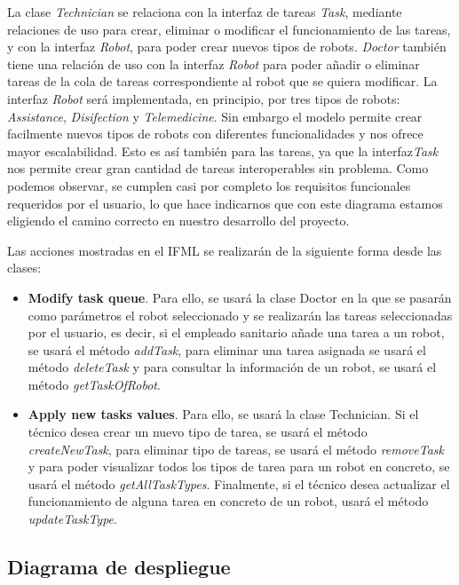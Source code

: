  La clase \textit{Technician} se relaciona con la interfaz de tareas \textit{Task}, mediante relaciones de uso para crear, eliminar o modificar el funcionamiento de las tareas, y con la interfaz \textit{Robot}, para poder crear nuevos tipos de robots. \textit{Doctor} también tiene una relación de uso con la interfaz \textit{Robot} para poder añadir o eliminar tareas de la cola de tareas correspondiente al robot que se quiera modificar. La interfaz \textit{Robot} será implementada, en principio, por tres tipos de robots: \textit{Assistance}, \textit{Disifection} y \textit{Telemedicine}. Sin embargo el modelo permite crear facilmente nuevos tipos de robots con diferentes funcionalidades y nos ofrece mayor escalabilidad. Esto es así también para las tareas, ya que la interfaz\textit{Task} nos permite crear gran cantidad de tareas interoperables sin problema. Como podemos observar, se cumplen casi por completo los requisitos funcionales requeridos por el usuario, lo que hace indicarnos que con este diagrama estamos eligiendo el camino correcto en nuestro desarrollo del proyecto. 
 
Las acciones mostradas en el IFML se realizarán de la siguiente forma desde las clases:

\begin{itemize}
  \item \textbf{Modify task queue}. Para ello, se usará la clase Doctor en la que se pasarán como parámetros el robot seleccionado y se realizarán las tareas seleccionadas por el usuario, es decir, si el empleado sanitario añade una tarea a un robot, se usará el método \textit{addTask}, para eliminar una tarea asignada se usará el método \textit{deleteTask} y para consultar la información de un robot, se usará el método \textit{getTaskOfRobot}.
  
  \item \textbf{Apply new tasks values}. Para ello, se usará la clase Technician. Si el técnico desea crear un nuevo tipo de tarea, se usará el método \textit{createNewTask}, para eliminar tipo de tareas, se usará el método \textit{removeTask} y para poder visualizar todos los tipos de tarea para un robot en concreto, se usará el método \textit{getAllTaskTypes}. Finalmente, si el técnico desea actualizar el funcionamiento de alguna tarea en concreto de un robot, usará el método \textit{updateTaskType}.
\end{itemize}

\subsection{Diagrama de despliegue}

